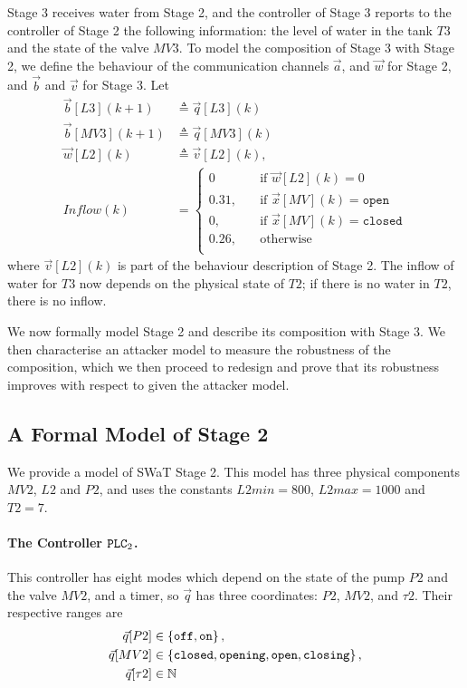 {{Stage 3 receives water from Stage 2, and the controller of Stage 3 reports to the controller of Stage 2 the following information: the level of water in the tank $T3$ and the state of the valve $MV3$. To model the composition of Stage 3 with Stage 2, we define the behaviour of the communication channels $\vec{a}$, and $\vec{w}$ for Stage 2, and $\vec{b}$ and $\vec{v}$ for Stage 3. Let  
\begin{align}
  \vec{b}[L3](k+1)&\triangleq \vec{q}[L3](k)\\
  \vec{b}[MV3](k+1)&\triangleq \vec{q}[MV3](k)\\
  \vec{w}[L2](k)&\triangleq \vec{v}[L2](k),\\
  Inflow(k)&=\begin{cases}
    0 & \quad \text{if $\vec{w}[L2](k)=0$}\\
    0.31,&\quad \text{if $\vec{x}[MV](k)=\texttt{open}$}\\
    0,&\quad \text{if $\vec{x}[MV](k)=\texttt{closed}$}\\
    0.26,&\quad \text{otherwise}\\
  \end{cases}
\end{align}
where $\vec{v}[L2](k)$ is part of the behaviour description of Stage 2. The inflow of water for $T3$ now depends on the physical state of $T2$; if there is no water in $T2$, there is no inflow.

We now formally model Stage 2 and describe its composition with Stage 3. We then characterise an attacker model to measure the robustness of the composition, which we then proceed to redesign and prove that its robustness improves with respect to given the attacker model.

\subsection{A Formal Model of Stage 2}
We provide a model of SWaT Stage 2. This model has three physical components $MV2$, $L2$ and $P2$, and uses the constants $L2min=800$, $L2max=1000$ and $T2=7$.

\paragraph{The Controller $\texttt{PLC}_2$.} 
This controller has eight modes which depend on the state of the pump $P2$ and the valve $MV2$, and a timer, so $\vec{q}$ has three coordinates: $P2$, $MV2$, and $\tau2$. Their respective ranges are 
\begin{align*}
  \vec{q}[P2]&\in\left\{\texttt{off},\texttt{on}\right\},\\
  \vec{q}[MV2]&\in\left\{\texttt{closed},\texttt{opening},\texttt{open},\texttt{closing}\right\},\\
  \vec{q}[\tau2]&\in\mathbb{N}
\end{align*}

}}
